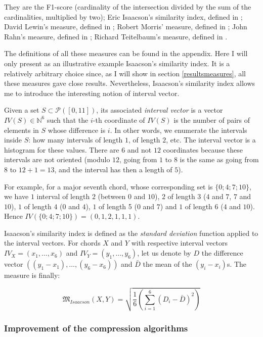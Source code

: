 \documentclass[a4paper,10pt]{article}
\begin{document}
They are the F1-score (cardinality of the intersection divided by the sum of the cardinalities, multiplied by two); Eric Isaacson's similarity index, defined in \cite{isaacson}; David Lewin's measure, defined in \cite{lewin}; Robert Morris' measure, defined in \cite{morris}; John Rahn's measure, defined in \cite{rahn}; Richard Teitelbaum's measure, defined in \cite{teitelbaum}.

The definitions of all these measures can be found in the appendix. Here I will only present as an illustrative example Isaacson's similarity index. It is a relatively arbitrary choice since, as I will show in section \ref{resultsmeasures}, all these measures gave close results. Nevertheless, Isaacson's similarity index allows me to introduce the interesting notion of interval vector.

Given a set $S\subset\mathcal{P}([0,11])$, its associated \emph{interval vector} is a vector $IV(S)\in\mathbb{N}^6$ such that the $i$-th coordinate of $IV(S)$ is the number of pairs of elements in $S$ whose difference is $i$. In other words, we enumerate the intervals inside $S$: how many intervals of length $1$, of length $2$, etc. The interval vector is a histogram for these values. There are $6$ and not $12$ coordinates because these intervals are not oriented (modulo $12$, going from $1$ to $8$ is the same as going from $8$ to $12+1=13$, and the interval has then a length of $5$).

For example, for a major seventh chord, whose corresponding set is $\{0;4;7;10\}$, we have $1$ interval of length $2$ (between $0$ and $10$), $2$ of length $3$ ($4$ and $7$, $7$ and $10$), $1$ of length $4$ ($0$ and $4$), $1$ of length 5 ($0$ and $7$) and $1$ of length $6$ ($4$ and $10$). Hence $IV(\{0;4;7;10\})=(0,1,2,1,1,1)$. 

Isaacson's similarity index is defined as the \emph{standard deviation} function applied to the interval vectors. For chords $X$ and $Y$ with respective interval vectors $IV_X=(x_1,\dots,x_6)$ and $IV_Y=(y_1,\dots,y_6)$, let us denote by $D$ the difference vector $((y_1-x_1),\dots,(y_6-x_6))$ and $\bar{D}$ the mean of the $(y_i-x_i)$s. The measure is finally:

\begin{equation*}
\mathfrak{M}_{Isaacson}(X,Y) = \sqrt{\frac{1}{6}\left(\sum_{i=1}^6\left(D_i-\bar{D}\right)^2\right)}
\end{equation*}


\subsubsection{Improvement of the compression algorithms}
\end{document}
